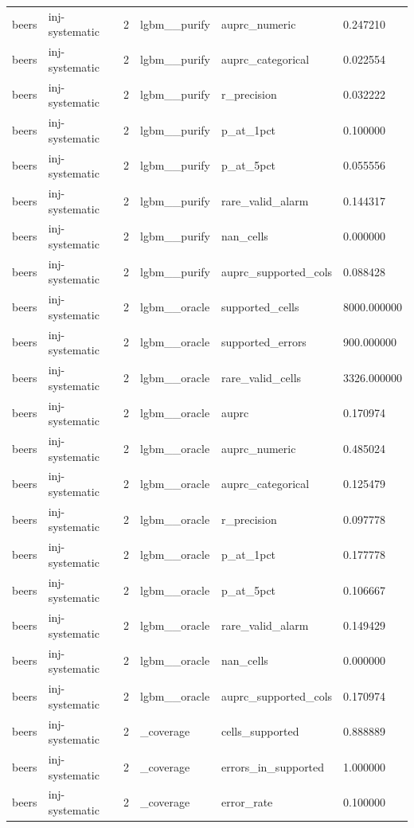 \begin{tabular}{llllll}
beers & inj-systematic & 2 & lgbm\_\_purify & auprc\_numeric & 0.247210 \\
beers & inj-systematic & 2 & lgbm\_\_purify & auprc\_categorical & 0.022554 \\
beers & inj-systematic & 2 & lgbm\_\_purify & r\_precision & 0.032222 \\
beers & inj-systematic & 2 & lgbm\_\_purify & p\_at\_1pct & 0.100000 \\
beers & inj-systematic & 2 & lgbm\_\_purify & p\_at\_5pct & 0.055556 \\
beers & inj-systematic & 2 & lgbm\_\_purify & rare\_valid\_alarm & 0.144317 \\
beers & inj-systematic & 2 & lgbm\_\_purify & nan\_cells & 0.000000 \\
beers & inj-systematic & 2 & lgbm\_\_purify & auprc\_supported\_cols & 0.088428 \\
beers & inj-systematic & 2 & lgbm\_\_oracle & supported\_cells & 8000.000000 \\
beers & inj-systematic & 2 & lgbm\_\_oracle & supported\_errors & 900.000000 \\
beers & inj-systematic & 2 & lgbm\_\_oracle & rare\_valid\_cells & 3326.000000 \\
beers & inj-systematic & 2 & lgbm\_\_oracle & auprc & 0.170974 \\
beers & inj-systematic & 2 & lgbm\_\_oracle & auprc\_numeric & 0.485024 \\
beers & inj-systematic & 2 & lgbm\_\_oracle & auprc\_categorical & 0.125479 \\
beers & inj-systematic & 2 & lgbm\_\_oracle & r\_precision & 0.097778 \\
beers & inj-systematic & 2 & lgbm\_\_oracle & p\_at\_1pct & 0.177778 \\
beers & inj-systematic & 2 & lgbm\_\_oracle & p\_at\_5pct & 0.106667 \\
beers & inj-systematic & 2 & lgbm\_\_oracle & rare\_valid\_alarm & 0.149429 \\
beers & inj-systematic & 2 & lgbm\_\_oracle & nan\_cells & 0.000000 \\
beers & inj-systematic & 2 & lgbm\_\_oracle & auprc\_supported\_cols & 0.170974 \\
beers & inj-systematic & 2 & \_coverage & cells\_supported & 0.888889 \\
beers & inj-systematic & 2 & \_coverage & errors\_in\_supported & 1.000000 \\
beers & inj-systematic & 2 & \_coverage & error\_rate & 0.100000 \\

\end{tabular}
